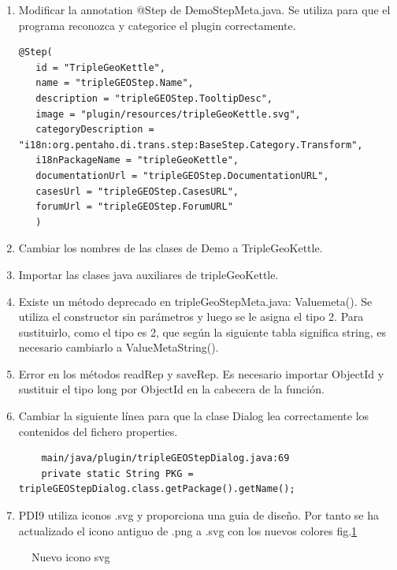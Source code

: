 \begin{enumerate}
    \item Modificar la annotation @Step de DemoStepMeta.java. Se utiliza para que el programa reconozca y
        categorice el plugin correctamente.
\begin{lstlisting}
@Step(
   id = "TripleGeoKettle",
   name = "tripleGEOStep.Name",
   description = "tripleGEOStep.TooltipDesc",
   image = "plugin/resources/tripleGeoKettle.svg",
   categoryDescription = "i18n:org.pentaho.di.trans.step:BaseStep.Category.Transform",
   i18nPackageName = "tripleGeoKettle",
   documentationUrl = "tripleGEOStep.DocumentationURL",
   casesUrl = "tripleGEOStep.CasesURL",
   forumUrl = "tripleGEOStep.ForumURL"
   )
\end{lstlisting}

    \item Cambiar los nombres de las clases de Demo a TripleGeoKettle.
    \item Importar las clases java auxiliares de tripleGeoKettle.
    \item Existe un método deprecado en tripleGeoStepMeta.java: Valuemeta(). Se utiliza el constructor sin
        parámetros y luego se le asigna el tipo 2. Para sustituirlo, como el tipo es 2, que según la siguiente
        tabla\cite{tabla-string} significa string, es necesario cambiarlo a ValueMetaString().

    \item Error en los métodos readRep y saveRep. Es necesario importar ObjectId
         y sustituir el tipo long por ObjectId en la cabecera de la función.

    \item Cambiar la siguiente línea para que la clase Dialog lea correctamente los contenidos del fichero
        properties.

    \begin{lstlisting}
    main/java/plugin/tripleGEOStepDialog.java:69
    private static String PKG = tripleGEOStepDialog.class.getPackage().getName();
    \end{lstlisting}

\item PDI9 utiliza iconos .svg y proporciona una guia de diseño\cite{guia-diseno}. Por tanto se ha actualizado el
    icono antiguo de .png a .svg con los nuevos colores fig.\ref{fig:icono-TGK}
\end{enumerate}

\begin{figure}[H]
  \centering
    
    \caption{Nuevo icono svg}
    \label{fig:icono-TGK}
    \centering
\end{figure}

